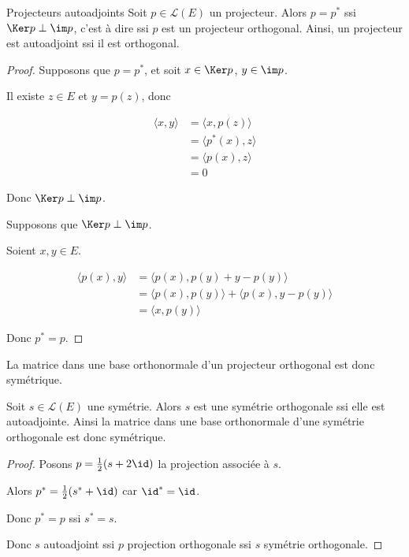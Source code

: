 \begin{proposition}{Projecteurs autoadjoints}{}
    Soit $p \in \mathscr L(E)$ un projecteur. Alors $p = p^*$ ssi 
    $\Ker p \perp \im p$, c'est à dire ssi $p$ est un projecteur orthogonal. 
    Ainsi, un projecteur est autoadjoint ssi il est orthogonal.
\end{proposition}

\begin{proof}
    Supposons que $p = p^*$, et soit $x \in \Ker p$, $y \in \im p$.

    Il existe $z \in E$ et $y = p(z)$, donc 

    \begin{align}
        \langle x, y \rangle & = \langle x, p(z) \rangle \\
        & = \langle p^*(x), z \rangle \\
        & = \langle p(x), z \rangle \\
        & = 0
    \end{align}

    Donc $\Ker p \perp \im p$. 

    Supposons que $\Ker p \perp \im p$. 

    Soient $x, y \in E$. 

    \begin{align}
        \langle p(x), y \rangle & = \langle p(x), p(y) + y - p(y) \rangle \\
        & = \langle p(x), p(y) \rangle + \langle p(x), y - p(y) \rangle \\
        & = \langle x, p(y) \rangle 
    \end{align}

    Donc $p^* = p$.
\end{proof}

\begin{corollaire}{}{}
    La matrice dans une base orthonormale d'un projecteur orthogonal est donc symétrique.
\end{corollaire}

\begin{corollaire}{}{}
    Soit $s \in \mathscr L(E)$ une symétrie. Alors 
    $s$ est une symétrie orthogonale ssi elle est autoadjointe.
    Ainsi la matrice dans une base orthonormale d'une symétrie orthogonale est donc symétrique.
\end{corollaire}

\begin{proof}
    Posons $p = \frac 1 2 (s + 2 \id)$ la projection associée à $s$. 

    Alors $p^* = \frac 1 2(s^* + \id)$ car $\id^* = \id$. 

    Donc $p^* = p$ ssi $s^* = s$.

    Donc $s$ autoadjoint ssi $p$ projection orthogonale ssi $s$ symétrie orthogonale. 
\end{proof}

